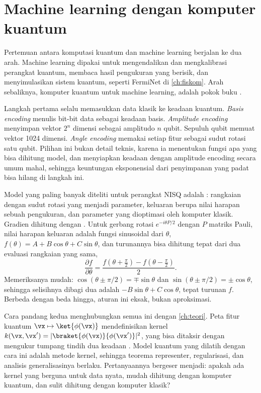 \section{Machine learning dengan komputer kuantum}

Pertemuan antara komputasi kuantum dan machine learning berjalan ke dua arah. Machine learning dipakai untuk mengendalikan dan
mengkalibrasi perangkat kuantum, membaca hasil pengukuran yang berisik, dan menyimulasikan sistem kuantum, seperti FermiNet di
\cref{ch:fiskom}. Arah sebaliknya, komputer kuantum untuk machine learning, adalah pokok buku \citet{schuld2021}.

Langkah pertama selalu memasukkan data klasik ke keadaan kuantum. \emph{Basis encoding} menulis bit-bit data sebagai keadaan basis.
\emph{Amplitude encoding} menyimpan vektor $2^n$ dimensi sebagai amplitudo $n$ qubit. Sepuluh qubit memuat vektor 1024 dimensi.
\emph{Angle encoding} memakai setiap fitur sebagai sudut rotasi satu qubit. Pilihan ini bukan detail teknis, karena ia menentukan fungsi
apa yang bisa dihitung model, dan menyiapkan keadaan dengan amplitude encoding secara umum mahal, sehingga keuntungan eksponensial
dari penyimpanan yang padat bisa hilang di langkah ini.

Model yang paling banyak diteliti untuk perangkat NISQ adalah : rangkaian dengan sudut rotasi yang
menjadi parameter, keluaran berupa nilai harapan sebuah pengukuran, dan parameter yang dioptimasi oleh komputer klasik. Gradien
dihitung dengan . Untuk gerbang rotasi $e^{-i\theta P/2}$ dengan $P$ matriks Pauli, nilai harapan keluaran
adalah fungsi sinusoidal dari $\theta$, $f(\theta)=A+B\cos\theta+C\sin\theta$, dan turunannya bisa dihitung tepat dari dua evaluasi
rangkaian yang sama,
\begin{equation}
\frac{\partial f}{\partial\theta}=\frac{f(\theta+\tfrac\pi2)-f(\theta-\tfrac\pi2)}2 .
\end{equation}
Memeriksanya mudah: $\cos(\theta\pm\pi/2)=\mp\sin\theta$ dan $\sin(\theta\pm\pi/2)=\pm\cos\theta$, sehingga selisihnya dibagi dua adalah
$-B\sin\theta+C\cos\theta$, tepat turunan $f$. Berbeda dengan beda hingga, aturan ini eksak, bukan aproksimasi.

Cara pandang kedua menghubungkan semua ini dengan \cref{ch:teori}. Peta fitur kuantum $\vx\mapsto\ket{\phi(\vx)}$ mendefinisikan kernel
$k(\vx,\vx')=|\braket{\phi(\vx)}{\phi(\vx')}|^2$, yang bisa ditaksir dengan mengukur tumpang tindih dua keadaan
\citep{havlicek2019}. Model kuantum yang dilatih dengan cara ini adalah metode kernel, sehingga teorema representer, regularisasi,
dan analisis generalisasinya berlaku. Pertanyaannya bergeser menjadi: apakah ada kernel yang berguna untuk data nyata, mudah dihitung
dengan komputer kuantum, dan sulit dihitung dengan komputer klasik?

